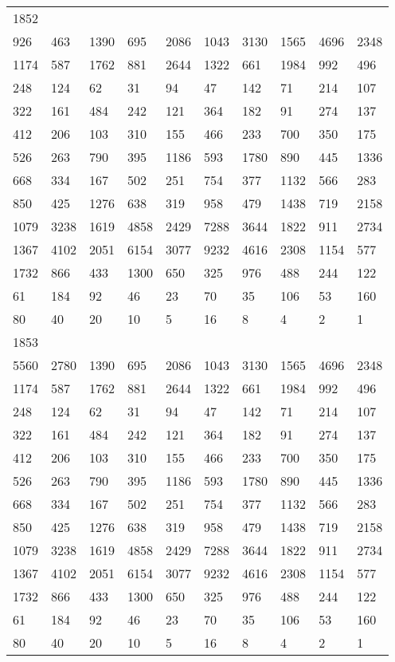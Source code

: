 \begin{longtable}{*{10}{l}}
1852&&&&&&&&&\\
926& 463& 1390& 695& 2086& 1043& 3130& 1565& 4696& 2348\\
1174& 587& 1762& 881& 2644& 1322& 661& 1984& 992& 496\\
248& 124& 62& 31& 94& 47& 142& 71& 214& 107\\
322& 161& 484& 242& 121& 364& 182& 91& 274& 137\\
412& 206& 103& 310& 155& 466& 233& 700& 350& 175\\
526& 263& 790& 395& 1186& 593& 1780& 890& 445& 1336\\
668& 334& 167& 502& 251& 754& 377& 1132& 566& 283\\
850& 425& 1276& 638& 319& 958& 479& 1438& 719& 2158\\
1079& 3238& 1619& 4858& 2429& 7288& 3644& 1822& 911& 2734\\
1367& 4102& 2051& 6154& 3077& 9232& 4616& 2308& 1154& 577\\
1732& 866& 433& 1300& 650& 325& 976& 488& 244& 122\\
61& 184& 92& 46& 23& 70& 35& 106& 53& 160\\
80& 40& 20& 10& 5& 16& 8& 4& 2& 1\\

1853&&&&&&&&&\\
5560& 2780& 1390& 695& 2086& 1043& 3130& 1565& 4696& 2348\\
1174& 587& 1762& 881& 2644& 1322& 661& 1984& 992& 496\\
248& 124& 62& 31& 94& 47& 142& 71& 214& 107\\
322& 161& 484& 242& 121& 364& 182& 91& 274& 137\\
412& 206& 103& 310& 155& 466& 233& 700& 350& 175\\
526& 263& 790& 395& 1186& 593& 1780& 890& 445& 1336\\
668& 334& 167& 502& 251& 754& 377& 1132& 566& 283\\
850& 425& 1276& 638& 319& 958& 479& 1438& 719& 2158\\
1079& 3238& 1619& 4858& 2429& 7288& 3644& 1822& 911& 2734\\
1367& 4102& 2051& 6154& 3077& 9232& 4616& 2308& 1154& 577\\
1732& 866& 433& 1300& 650& 325& 976& 488& 244& 122\\
61& 184& 92& 46& 23& 70& 35& 106& 53& 160\\
80& 40& 20& 10& 5& 16& 8& 4& 2& 1\\


\end{longtable}
